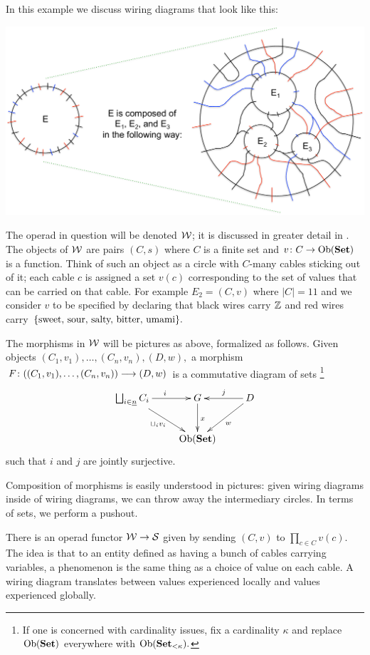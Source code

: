 \documentclass[CT4S-EN-RU]{subfiles}
\begin{document}
\begin{exampleENG}
In this example we discuss wiring diagrams that look like this:
\begin{center}
\includegraphics[width=\textwidth]{wiringDiagram}
\end{center}
The operad in question will be denoted $\mathcal{W}$; it is discussed in greater detail in \cite{Sp4}. The objects of $\mathcal{W}$ are pairs $(C,s)$ where $C$ is a finite set and $v\colon C\rightarrow\textnormal{Ob}({\mathbf{Set}})$ is a function. Think of such an object as a circle with $C$-many cables sticking out of it; each cable $c$ is assigned a set $v(c)$ corresponding to the set of values that can be carried on that cable. For example $E_2=(C,v)$ where $|C|=11$ and we consider $v$ to be specified by declaring that black wires carry ${\mathbb Z}$ and red wires carry $\{\textnormal{sweet, sour, salty, bitter, umami}\}.$ 

The morphisms in $\mathcal{W}$ will be pictures as above, formalized as follows. Given objects $(C_1,v_1),\ldots,(C_n,v_n), (D,w),$ a morphism $F\colon((C_1,v_1),\ldots,(C_n,v_n))\longrightarrow (D,w)$ is a commutative diagram of sets
\footnote{If one is concerned with cardinality issues, fix a cardinality $\kappa$ and replace $\textnormal{Ob}({\mathbf{Set}})$ everywhere with $\textnormal{Ob}({\mathbf{Set}}_{<\kappa}).$} 
$$
\xymatrix{\bigsqcup_{i\in\ul{n}}C_i\ar[rd]_{\sqcup_iv_i}\ar[r]^i&G\ar[d]^x&D\ar[l]_j\ar[ld]^w\\&\Ob(\Set)}
$$
such that $i$ and $j$ are jointly surjective.

Composition of morphisms is easily understood in pictures: given wiring diagrams inside of wiring diagrams, we can throw away the intermediary circles. In terms of sets, we perform a pushout.

There is an operad functor $\mathcal{W}\rightarrow\mathcal{S}$ given by sending $(C,v)$ to $\prod_{c\in C}v(c).$ The idea is that to an entity defined as having a bunch of cables carrying variables, a phenomenon is the same thing as a choice of value on each cable. A wiring diagram translates between values experienced locally and values experienced globally. 
\end{exampleENG}
\end{document}
